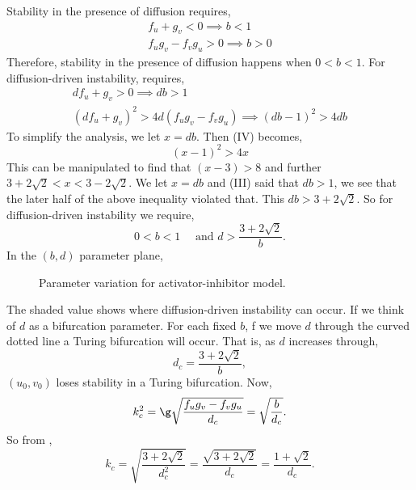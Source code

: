 \noindent
Stability in the presence of diffusion requires,
\begin{align*}
  f_u + g_v < 0 \implies b < 1 \tag{I}\\
  f_ug_v - f_vg_u > 0 \implies b > 0 \tag{II}
\end{align*}
Therefore, stability in the presence of diffusion happens when $0 < b< 1$. For diffusion-driven instability, requires,
\begin{align*}
  df_u + g_v > 0 \implies db > 1 \tag{III}\\
  (df_u + g_v)^2 > 4d(f_ug_v - f_vg_u) \implies (db - 1)^2 > 4db \tag{IV}
\end{align*}
To simplify the analysis, we let $x = db$. Then (IV) becomes,
$$ (x - 1)^2 > 4x $$
This can be manipulated to find that $(x - 3) > 8$ and further $3 + 2\sqrt 2 < x < 3 - 2\sqrt{2}$. We let $x = db$ and (III) said that $db > 1$, we see that the later half of the above inequality violated that. This $db > 3 + 2\sqrt 2$. So for diffusion-driven instability we require,
$$ 0 < b < 1 \quad \text{ and } d > \frac{3 + 2\sqrt 2}{b}. $$
In the $(b, d)$ parameter plane,

\begin{figure}[!ht]
\centering
\resizebox{0.6\textwidth}{!}{}
\caption{Parameter variation for activator-inhibitor model.}
\end{figure}

The shaded value shows where diffusion-driven instability can occur. If we think of $d$ as a bifurcation parameter. For each fixed $b$, f we move $d$ through the curved dotted line a Turing bifurcation will occur. That is, as $d$ increases through,
\begin{equation}
  d_c = \frac{3 + 2\sqrt{2}}{b},\tag{$*$}\label{equ:dcex}
\end{equation}
$(u_0, v_0)$ loses stability in a Turing bifurcation. Now,
$$ k_c^2 = \g \sqrt{\frac{f_ug_v - f_vg_u}{d_c}} = \sqrt{\frac{b}{d_c}}. $$
So from ,
$$ k_c = \sqrt{\frac{3 + 2\sqrt 2}{d_c^2}} = \frac{\sqrt{3 + 2\sqrt 2}}{d_c} = \frac{1 + \sqrt 2}{d_c}. $$

